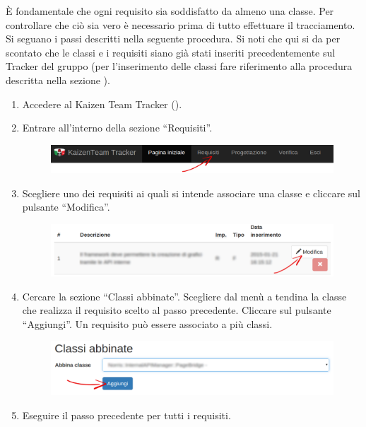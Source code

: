 				 \label{sec:ProgTracClasReq}
					È fondamentale che ogni requisito sia soddisfatto da almeno una classe. Per controllare che ciò sia vero è necessario prima di tutto effettuare il tracciamento. Si seguano i passi descritti nella seguente procedura. Si noti che qui si da per scontato che le classi e i requisiti siano già stati inseriti precedentemente sul Tracker del gruppo (per l'inserimento delle classi fare riferimento alla procedura descritta nella sezione ).
					\begin{enumerate}
						\item Accedere al Kaizen Team Tracker ().
						\item Entrare all'interno della sezione “Requisiti”.
						\begin{figure}[H]
							\centering
							\includegraphics[width=\textwidth]{Pics/HomePageMenuFrecciaReq}
						\end{figure}
						\item Scegliere uno dei requisiti ai quali si intende associare una classe e cliccare sul pulsante “Modifica”.
						\begin{figure}[H]
							\centering
							\includegraphics[width=\textwidth]{Pics/VistaRequisitoFrecciaModifica}
						\end{figure}
						\item Cercare la sezione “Classi abbinate”. Scegliere dal menù a tendina la classe che realizza il requisito scelto al passo precedente. Cliccare sul pulsante “Aggiungi”. Un requisito  può essere associato a più classi.
						\begin{figure}[H]
							\centering
							\includegraphics[width=\textwidth]{Pics/AbbinareClasseRequisito}
						\end{figure}
						\item Eseguire il passo precedente per tutti i requisiti.
					\end{enumerate}
